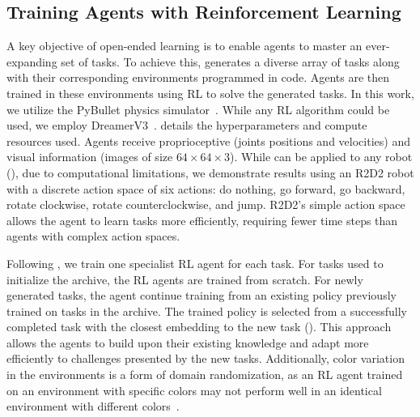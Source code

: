 \documentclass{article} %
\begin{document}
\vspace{-4pt}
\subsection{Training Agents with Reinforcement Learning}
\label{subsec:train-agent-rl}
\vspace{-4pt}
%
A key objective of open-ended learning is to enable agents to master an ever-expanding set of tasks. To achieve this, \ours{} generates a diverse array of tasks along with their corresponding environments programmed in code. Agents are then trained in these environments using RL to solve the generated tasks. In this work, we utilize the PyBullet physics simulator~\citep{coumans2016pybullet}. While any RL algorithm could be used, we employ DreamerV3~\citep{hafner_MasteringDiverseDomains_2024}.  details the hyperparameters and compute resources used.
Agents receive proprioceptive (joints positions and velocities) and visual information (images of size $64 \times 64 \times 3$). While \ours{} can be applied to any robot (), due to computational limitations, we demonstrate results using an R2D2 robot with a discrete action space of six actions: do nothing, go forward, go backward, rotate clockwise, rotate counterclockwise, and jump. R2D2's simple action space allows the agent to learn tasks more efficiently, requiring fewer time steps than agents with complex action spaces.

Following \citet{wang_EnhancedPOETOpenended_2020}, we train one specialist RL agent for each task. For tasks used to initialize the archive, the RL agents are trained from scratch. For newly generated tasks, the agent continue training from an existing policy previously trained on tasks in the archive. The trained policy is selected from a successfully completed task with the closest embedding to the new task (). This approach allows the agents to build upon their existing knowledge and adapt more efficiently to challenges presented by the new tasks. Additionally, color variation in the environments is a form of domain randomization, as an RL agent trained on an environment with specific colors may not perform well in an identical environment with different colors~\citep{tobin2017domain}.

\end{document}
